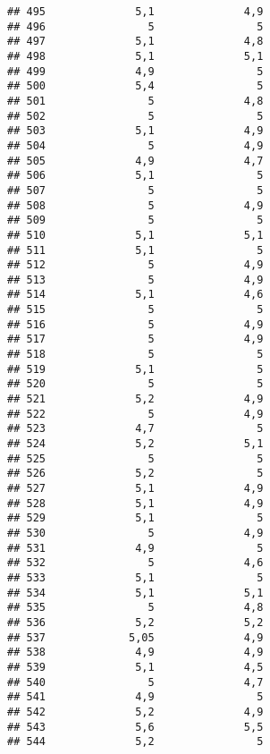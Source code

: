 \documentclass[
]{article}
\begin{document}
\begin{verbatim}
## 495              5,1              4,9
## 496                5                5
## 497              5,1              4,8
## 498              5,1              5,1
## 499              4,9                5
## 500              5,4                5
## 501                5              4,8
## 502                5                5
## 503              5,1              4,9
## 504                5              4,9
## 505              4,9              4,7
## 506              5,1                5
## 507                5                5
## 508                5              4,9
## 509                5                5
## 510              5,1              5,1
## 511              5,1                5
## 512                5              4,9
## 513                5              4,9
## 514              5,1              4,6
## 515                5                5
## 516                5              4,9
## 517                5              4,9
## 518                5                5
## 519              5,1                5
## 520                5                5
## 521              5,2              4,9
## 522                5              4,9
## 523              4,7                5
## 524              5,2              5,1
## 525                5                5
## 526              5,2                5
## 527              5,1              4,9
## 528              5,1              4,9
## 529              5,1                5
## 530                5              4,9
## 531              4,9                5
## 532                5              4,6
## 533              5,1                5
## 534              5,1              5,1
## 535                5              4,8
## 536              5,2              5,2
## 537             5,05              4,9
## 538              4,9              4,9
## 539              5,1              4,5
## 540                5              4,7
## 541              4,9                5
## 542              5,2              4,9
## 543              5,6              5,5
## 544              5,2                5
\end{verbatim}
\end{document}

